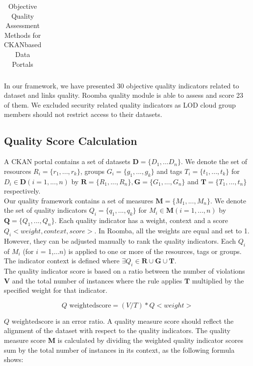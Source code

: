 \documentclass[onecolumn, crcready]{iosart2c}
\begin{document}
\begin{table}[h!]
\begin{center}
{\begin{tabular}{|c|L|}
\end{tabular}
}
\caption{Objective Quality Assessment Methods for CKAN\-based Data Portals}
\end{center}
\end{table}

In our framework, we have presented 30 objective quality indicators related to dataset and links quality. Roomba quality module is able to assess and score 23 of them. We excluded security related quality indicators as LOD cloud group members should not restrict access to their datasets.

\subsection{Quality Score Calculation}

A CKAN portal contains a set of datasets $\textbf{D} = \{D_1,...D_n\}$. We denote the set of resources $R_i = \{r_1,...,r_k\}$, groups $G_i = \{g_1,...,g_k\}$ and tags $T_i = \{t_1,...,t_k\}$ for $D_i \in \textbf{D} (i=1,...,n)$ by $  \textbf{R}=\{R_1,...,R_n\}, \textbf{G}=\{G_1,...,G_n\}$ and $\textbf{T}=\{T_1,...,t_n\}$ respectively.\\
Our quality framework contains a set of measures $\textbf{M} = \{M_1,...,M_n\}$. We denote the set of quality indicators $Q_i = \{q_1,...,q_k\}$ for $M_i \in \textbf{M} (i=1,...,n)$ by $\textbf{Q} = \{Q_1,...,Q_n\}$. Each quality indicator has a weight, context and a score $Q_i<weight, context, score>$. In Roomba, all the weights are equal and set to 1. However, they can be adjusted manually to rank the quality indicators. Each $Q_i$ of $M_i$ (for $i$ = 1,...$n$) is applied to one or more of the resources, tags or groups. The indicator context is defined where $\exists Q_i \in \textbf{R} \cup \textbf{G} \cup \textbf{T}$.\\
The quality indicator score is based on a ratio between the number of violations $\textbf{V}$ and the total number of instances where the rule applies $\textbf{T}$ multiplied by the specified weight for that indicator.

\begin{equation}
 Q\textrm{ weightedscore} = (V/T) * Q<weight>
\end{equation}

$Q\textrm{ weightedscore}$ is an error ratio. A quality measure score should reflect the alignment of the dataset with respect to the quality indicators. The quality measure score \textbf{M} is calculated by dividing the weighted quality indicator scores sum by the total number of instances in its context, as the following formula shows:
\end{document}
